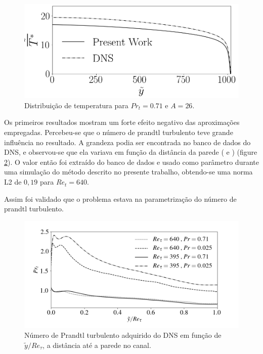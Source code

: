 \begin{figure}[!h]
\begin{minipage}{0.49\textwidth}
  \end{minipage}
  \hfill
  \begin{minipage}{0.49\textwidth}
    \centering
    \includegraphics[angle=0, scale=0.32]{fotos_formatacao_final/Temperature_1000_071_classico}
  \end{minipage}
  \caption{Distribuição de temperatura para $Pr_t = 0.71$ e $A = 26$.} 
  \label{figuraresultados1}
\end{figure}

Os primeiros resultados mostram um forte efeito negativo das aproximações empregadas. Percebeu-se que o número de prandtl turbulento teve grande influência no resultado.
A grandeza podia ser encontrada no banco de dados do DNS, e observou-se que ela variava em função da distância da parede (\cite{dns1020} e \cite{dns150}) (figure \ref{figure5}).
O valor então foi extraído do banco de dados e usado como parâmetro durante uma simulação do método descrito no presente trabalho, obtendo-se uma norma L2 de $ 0,19 $ para $ Re_t = 640 $.

Assim foi validado que o problema estava na parametrização do número de prandtl turbulento.

\begin{figure}[h!]
	\centering
	\includegraphics[angle=0, scale=0.62]{fotos_formatacao_final/DNS_PRt}
	\caption{Número de Prandtl turbulento adquirido do DNS em função de $ \tilde{y}/Re_\tau $, a distância até a parede no canal.}
	\label{figure5}
\end{figure}

